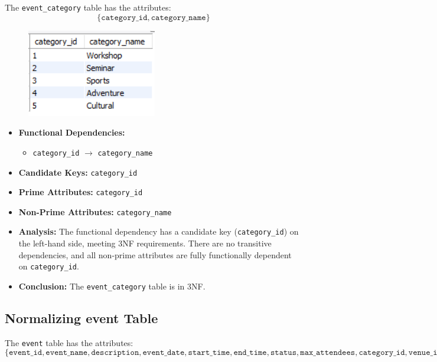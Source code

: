 The \texttt{event\_category} table has the attributes:
\[
\{ \texttt{category\_id}, \texttt{category\_name} \}
\]
\begin{figure}
    [h]
    \centering
    \includegraphics{images/table_data/event_category.png}
\end{figure}
\begin{itemize}
    \item \textbf{Functional Dependencies:}
    \begin{itemize}
        \item \texttt{category\_id} $\rightarrow$ \texttt{category\_name}
    \end{itemize}

    \item \textbf{Candidate Keys:} \texttt{category\_id}

    \item \textbf{Prime Attributes:} \texttt{category\_id}

    \item \textbf{Non-Prime Attributes:} \texttt{category\_name}

    \item \textbf{Analysis:} The functional dependency has a candidate key (\texttt{category\_id}) on the left-hand side, meeting 3NF requirements. There are no transitive dependencies, and all non-prime attributes are fully functionally dependent on \texttt{category\_id}.

    \item \textbf{Conclusion:} The \texttt{event\_category} table is in 3NF.
\end{itemize}

\subsection{Normalizing event Table}

The \texttt{event} table has the attributes:
\[
\{ \texttt{event\_id}, \texttt{event\_name}, \texttt{description}, \texttt{event\_date}, \texttt{start\_time}, \texttt{end\_time}, \texttt{status}, \texttt{max\_attendees}, \texttt{category\_id}, \texttt{venue\_id} \}
\]

